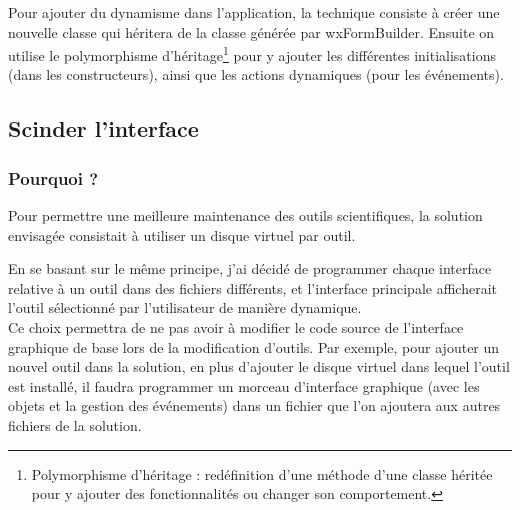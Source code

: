 Pour ajouter du dynamisme dans l'application, la technique consiste à créer une nouvelle classe qui héritera de la classe générée par wxFormBuilder.
Ensuite on utilise le polymorphisme d'héritage\footnote{Polymorphisme d'héritage : redéfinition d'une méthode d'une classe héritée pour y ajouter des fonctionnalités ou changer son comportement.} pour y ajouter les différentes initialisations (dans les constructeurs), ainsi que les actions dynamiques (pour les événements).
\\





\subsection{Scinder l'interface}
\label{Scinder l'interface}


\subsubsection{Pourquoi ?}

Pour permettre une meilleure maintenance des outils scientifiques, la solution envisagée consistait à utiliser un disque virtuel par outil.

En se basant sur le même principe, j'ai décidé de programmer chaque interface relative à un outil dans des fichiers différents, et l'interface principale afficherait l'outil sélectionné par l'utilisateur de manière dynamique.
\\


Ce choix permettra de ne pas avoir à modifier le code source de l'interface graphique de base lors de la modification d'outils.
Par exemple, pour ajouter un nouvel outil dans la solution, en plus d'ajouter le disque virtuel dans lequel l'outil est installé, il faudra programmer un morceau d'interface graphique (avec les objets et la gestion des événements) dans un fichier que l'on ajoutera aux autres fichiers de la solution.
\\



